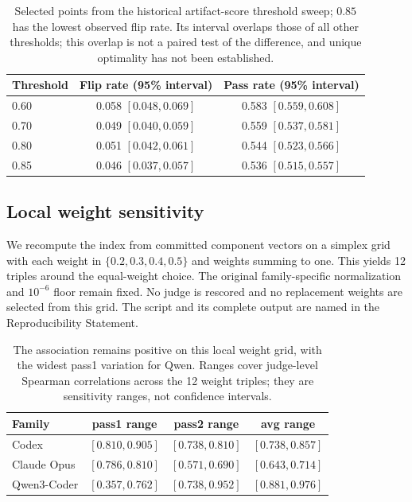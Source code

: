 \begin{table}[h]
\centering\small
\begin{tabular}{@{}lcc@{}}
\toprule
Threshold & Flip rate (95\% interval) & Pass rate (95\% interval) \\
\midrule
0.60 & 0.058 $[0.048,0.069]$ & 0.583 $[0.559,0.608]$ \\
0.70 & 0.049 $[0.040,0.059]$ & 0.559 $[0.537,0.581]$ \\
0.80 & 0.051 $[0.042,0.061]$ & 0.544 $[0.523,0.566]$ \\
0.85 & 0.046 $[0.037,0.057]$ & 0.536 $[0.515,0.557]$ \\
\bottomrule
\end{tabular}
\caption{Selected points from the historical artifact-score threshold sweep; $0.85$ has the lowest observed flip rate.
Its interval overlaps those of all other thresholds; this overlap is not a paired test of the difference, and unique optimality has not been established.}
\label{tab:exp13_threshold_sweep}
\end{table}

\subsection{Local weight sensitivity}\label{app:weight-sensitivity}
We recompute the index from committed component vectors on a simplex grid with each weight in $\{0.2,0.3,0.4,0.5\}$ and weights summing to one.
This yields 12 triples around the equal-weight choice.
The original family-specific normalization and $10^{-6}$ floor remain fixed.
No judge is rescored and no replacement weights are selected from this grid.
The script and its complete output are named in the Reproducibility Statement.

\begin{table}[h]
\centering\small
\begin{tabular}{@{}lccc@{}}
\toprule
Family & pass1 range & pass2 range & avg range \\
\midrule
Codex & $[0.810,0.905]$ & $[0.738,0.810]$ & $[0.738,0.857]$ \\
Claude Opus & $[0.786,0.810]$ & $[0.571,0.690]$ & $[0.643,0.714]$ \\
Qwen3-Coder & $[0.357,0.762]$ & $[0.738,0.952]$ & $[0.881,0.976]$ \\
\bottomrule
\end{tabular}
\caption{The association remains positive on this local weight grid, with the widest pass1 variation for Qwen.
Ranges cover judge-level Spearman correlations across the 12 weight triples; they are sensitivity ranges, not confidence intervals.}
\label{tab:weight-sensitivity}
\end{table}
